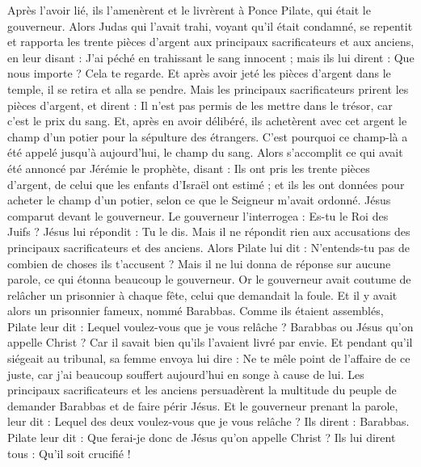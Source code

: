 \begin{multicols}{2}
Après l'avoir lié, ils l'amenèrent et le livrèrent à Ponce Pilate, qui était le gouverneur.
Alors Judas qui l'avait trahi, voyant qu'il était condamné, se repentit et rapporta les trente pièces d'argent aux principaux sacrificateurs et aux anciens,
en leur disant : J'ai péché en trahissant le sang innocent ; mais ils lui dirent : Que nous importe ? Cela te regarde.
Et après avoir jeté les pièces d'argent dans le temple, il se retira et alla se pendre.
Mais les principaux sacrificateurs prirent les pièces d'argent, et dirent : Il n'est pas permis de les mettre dans le trésor, car c'est le prix du sang.
Et, après en avoir délibéré, ils achetèrent avec cet argent le champ d'un potier pour la sépulture des étrangers.
C'est pourquoi ce champ-là a été appelé jusqu'à aujourd'hui, le champ du sang.
Alors s'accomplit ce qui avait été annoncé par Jérémie le prophète, disant : Ils ont pris les trente pièces d'argent, de celui que les enfants d'Israël ont estimé ;
et ils les ont données pour acheter le champ d'un potier, selon ce que le Seigneur m'avait ordonné.
Jésus comparut devant le gouverneur. Le gouverneur l'interrogea : Es-tu le Roi des Juifs ? Jésus lui répondit : Tu le dis.
Mais il ne répondit rien aux accusations des principaux sacrificateurs et des anciens.
Alors Pilate lui dit : N'entends-tu pas de combien de choses ils t'accusent ?
Mais il ne lui donna de réponse sur aucune parole, ce qui étonna beaucoup le gouverneur.
Or le gouverneur avait coutume de relâcher un prisonnier à chaque fête, celui que demandait la foule.
Et il y avait alors un prisonnier fameux, nommé Barabbas.
Comme ils étaient assemblés, Pilate leur dit : Lequel voulez-vous que je vous relâche ? Barabbas ou Jésus qu'on appelle Christ ?
Car il savait bien qu'ils l'avaient livré par envie.
Et pendant qu'il siégeait au tribunal, sa femme envoya lui dire : Ne te mêle point de l'affaire de ce juste, car j'ai beaucoup souffert aujourd'hui en songe à cause de lui.
Les principaux sacrificateurs et les anciens persuadèrent la multitude du peuple de demander Barabbas et de faire périr Jésus.
Et le gouverneur prenant la parole, leur dit : Lequel des deux voulez-vous que je vous relâche ? Ils dirent : Barabbas.
Pilate leur dit : Que ferai-je donc de Jésus qu'on appelle Christ ? Ils lui dirent tous : Qu'il soit crucifié !

\end{multicols}
